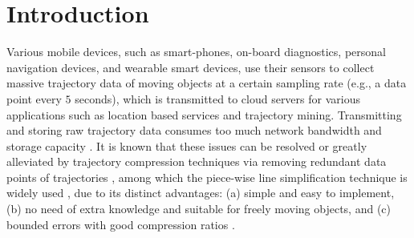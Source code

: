\section{Introduction}
\label{sec-intro}

Various mobile devices, such as smart-phones, on-board diagnostics, personal navigation devices, and wearable smart devices, use their sensors to collect massive trajectory data of moving objects at a certain sampling rate (e.g., a data point every $5$ seconds), which is transmitted to cloud servers for various applications such as location based services and trajectory mining.
%
Transmitting and storing raw trajectory data consumes too much network bandwidth and storage capacity \cite{Chen:Trajectory, Meratnia:Spatiotemporal,Shi:Survey, Lin:Operb, Liu:BQS, Liu:Amnesic, Muckell:survey, Muckell:Compression,Cao:Spatio, Popa:Spatio,Nibali:Trajic}. %
%
%
It is known that these issues can be resolved or greatly alleviated by trajectory compression techniques via removing redundant data points of trajectories \cite{Douglas:Peucker, Hershberger:Speeding, Meratnia:Spatiotemporal,Lin:Operb, Liu:BQS, Liu:Amnesic,  Muckell:Compression, Chen:Trajectory, Cao:Spatio,  Nibali:Trajic, Long:Direction, Popa:Spatio, Han:Compress, Chen:Fast}, among which the piece-wise line simplification technique is widely used \cite{Douglas:Peucker, Meratnia:Spatiotemporal,  Muckell:Compression, Chen:Trajectory, Cao:Spatio, Liu:BQS, Liu:Amnesic, Lin:Operb, Chen:Fast}, due to its distinct advantages: (a) simple and easy to implement, (b) no need of extra knowledge and suitable for freely  moving  objects, and (c) bounded errors with good compression ratios \cite{Popa:Spatio,Lin:Operb}.

